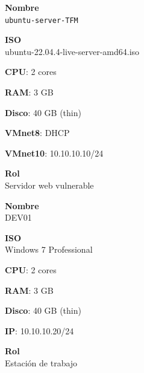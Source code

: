\begin{figure}[H]
\centering

\begin{minipage}[t]{0.33\textwidth}
\begin{tcolorbox}[
    colback=orange!5,
    colframe=orange!70!black,
    title=\small\textbf{🧱 Ubuntu Server 22.04},
    fonttitle=\bfseries,
    boxrule=0.5pt]

\footnotesize
\textbf{Nombre}\\
\texttt{ubuntu-server-TFM}

\vspace{0.2cm}

\textbf{ISO}\\
ubuntu-22.04.4-live-server-amd64.iso

\vspace{0.2cm}

\textbf{CPU}: 2 cores

\textbf{RAM}: 3 GB

\textbf{Disco}: 40 GB (thin)

\textbf{VMnet8}: DHCP

\textbf{VMnet10}: 10.10.10.10/24

\textbf{Rol}\\
Servidor web vulnerable

\end{tcolorbox}
\end{minipage}
\hfill
\begin{minipage}[t]{0.30\textwidth}
\begin{tcolorbox}[
    colback=cyan!5,
    colframe=cyan!70!black,
    title=\small\textbf{💻 DEV01},
    fonttitle=\bfseries,
    boxrule=0.5pt]

\footnotesize
\textbf{Nombre}\\
DEV01

\vspace{0.2cm}

\textbf{ISO}\\
Windows 7 Professional

\vspace{0.2cm}

\textbf{CPU}: 2 cores

\textbf{RAM}: 3 GB

\textbf{Disco}: 40 GB (thin)

\textbf{IP}: 10.10.10.20/24

\textbf{Rol}\\
Estación de trabajo

\end{tcolorbox}
\end{minipage}
\hfill
\begin{minipage}[t]{0.30\textwidth}
\begin{tcolorbox}[
    colback=blue!5,
    colframe=blue!70!black,
    title=\small\textbf{🪟 DC01},
    fonttitle=\bfseries,
    boxrule=0.5pt]


\end{tcolorbox}
\end{minipage}
\end{figure}
